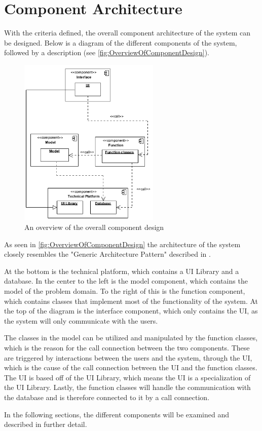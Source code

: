 \section{Component Architecture} \label{sc:component_architecture}
With the criteria defined, the overall component architecture of the system can be designed. Below is a diagram of the different components of the system, followed by a description (see \autoref{fig:OverviewOfComponentDesign}).

\begin{figure}[H]
    \centering
    \includegraphics[width=0.60\textwidth]{figures/ComponentDiagrams/ComponentDesignOverview.png}
    \caption{An overview of the overall component design}
    \label{fig:OverviewOfComponentDesign}
\end{figure}

As seen in \autoref{fig:OverviewOfComponentDesign} the architecture of the system closely resembles the "Generic Architecture Pattern" described in \citep[p 198]{OOAD}.
\par
At the bottom is the technical platform, which contains a UI Library and a database. In the center to the left is the model component, which contains the model of the problem domain. To the right of this is the function component, which contains classes that implement most of the functionality of the system. At the top of the diagram is the interface component, which only contains the UI, as the system will only communicate with the users.
\par
The classes in the model can be utilized and manipulated by the function classes, which is the reason for the call connection between the two components. These are triggered by interactions between the users and the system, through the UI, which is the cause of the call connection between the UI and the function classes.\\
The UI is based off of the UI Library, which means the UI is a specialization of the UI Library. Lastly, the function classes will handle the communication with the database and is therefore connected to it by a call connection.
\par
In the following sections, the different components will be examined and described in further detail.